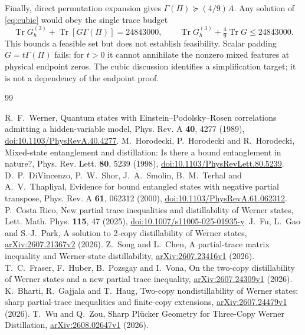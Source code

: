\documentclass[11pt,a4paper]{article}
\theoremstyle{definition}\newtheorem{definition}[theorem]{Definition}
\theoremstyle{remark}\newtheorem{remark}[theorem]{Remark}
\DeclareMathOperator{\Tr}{Tr}\DeclareMathOperator{\rank}{rank}
\numberwithin{equation}{section}
\begin{document}
Finally, direct permutation expansion gives
$\Gamma(\Pi)\succeq(4/9)A$. Any solution of \eqref{eq:cubic}
would obey the single trace budget
\[
\Tr G_h^{(3)}+\Tr[G\Gamma(\Pi)]=24843000,\qquad
\Tr G_h^{(3)}+\tfrac49\Tr G\le24843000.
\]
This bounds a feasible set but does not establish feasibility.
Scalar padding $G=t\Gamma(\Pi)$ fails: for $t>0$ it cannot
annihilate the nonzero mixed features at physical endpoint zeros.
The cubic discussion identifies a simplification target; it is
not a dependency of the endpoint proof.

\begin{thebibliography}{99}
\small\raggedright
{}
R.~F.~Werner, Quantum states with Einstein--Podolsky--Rosen correlations
admitting a hidden-variable model,
Phys. Rev. A \textbf{40}, 4277 (1989),
\href{https://doi.org/10.1103/PhysRevA.40.4277}{doi:10.1103/PhysRevA.40.4277}.
M.~Horodecki, P.~Horodecki and R.~Horodecki,
Mixed-state entanglement and distillation: Is there a bound entanglement
in nature?, Phys. Rev. Lett. \textbf{80}, 5239 (1998),
\href{https://doi.org/10.1103/PhysRevLett.80.5239}{doi:10.1103/PhysRevLett.80.5239}.
D.~P.~DiVincenzo, P.~W.~Shor, J.~A.~Smolin, B.~M.~Terhal and A.~V.~Thapliyal,
Evidence for bound entangled states with negative partial transpose,
Phys. Rev. A \textbf{61}, 062312 (2000),
\href{https://doi.org/10.1103/PhysRevA.61.062312}{doi:10.1103/PhysRevA.61.062312}.
P.~Costa Rico, New partial trace inequalities and distillability of
Werner states, Lett. Math. Phys. \textbf{115}, 47 (2025),
\href{https://doi.org/10.1007/s11005-025-01935-y}{doi:10.1007/s11005-025-01935-y}.
J.~Fu, L.~Gao and S.-J.~Park, A solution to 2-copy distillability of
Werner states, \href{https://arxiv.org/abs/2607.21367v2}{arXiv:2607.21367v2} (2026).
Z.~Song and L.~Chen, A partial-trace matrix inequality and Werner-state
distillability, \href{https://arxiv.org/abs/2607.23416v1}{arXiv:2607.23416v1} (2026).
T.~C.~Fraser, F.~Huber, B.~Pozsgay and I.~Vona, On the two-copy
distillability of Werner states and a new partial trace inequality,
\href{https://arxiv.org/abs/2607.24309v1}{arXiv:2607.24309v1} (2026).
K.~Bharti, R.~Gajjala and T.~Haug, Two-copy nondistillability of Werner
states: sharp partial-trace inequalities and finite-copy extensions,
\href{https://arxiv.org/abs/2607.24479v1}{arXiv:2607.24479v1} (2026).
T.~Wu and Q.~Zou, Sharp Pl\"ucker Geometry for Three-Copy Werner
Distillation, \href{https://arxiv.org/abs/2608.02647v1}{arXiv:2608.02647v1} (2026).

\end{thebibliography}
\end{document}
